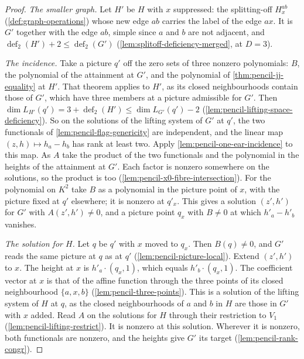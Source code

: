 \begin{proof}
  \leanok
  \emph{The smaller graph.} Let $H'$ be $H$ with $x$ suppressed: the
  splitting-off $H_x^{ab}$ (\cref{def:graph-operations}) whose new edge
  $ab$ carries the label of the edge $ax$. It is $G'$ together with the
  edge $ab$, simple since $a$ and $b$ are not adjacent, and
  $\operatorname{def}_2(H') + 2 \le \operatorname{def}_2(G')$
  (\cref{lem:splitoff-deficiency-merged}, at $D = 3$).

  \emph{The incidence.} Take a picture $q'$ off the zero sets of three
  nonzero polynomials: $B$, the polynomial of the attainment at $G'$, and
  the polynomial of \cref{thm:pencil-jj-equality} at $H'$. That theorem
  applies to $H'$, as its
  closed neighbourhoods contain those of $G'$, which have three members at
  a picture admissible for $G'$. Then
  $\dim L_{H'}(q') = 3 + \operatorname{def}_2(H') \le \dim L_{G'}(q') - 2$
  (\cref{lem:pencil-lifting-space-deficiency}). So on the solutions of the
  lifting system of $G'$ at $q'$, the two functionals of
  \cref{lem:pencil-flag-genericity} are independent, and the linear map
  $(z, h) \mapsto h_a - h_b$ has rank at least two. Apply
  \cref{lem:pencil-one-ear-incidence} to this map. As $A$ take the product
  of the two functionals and the polynomial in the heights of the
  attainment at $G'$. Each factor is nonzero somewhere on the solutions,
  so the product is too (\cref{lem:pencil-x0-fibre-intersection}). For the
  polynomial on $K^2$ take $B$ as a polynomial in the picture point of $x$,
  with the picture fixed at $q'$ elsewhere; it is nonzero at $q'_x$. This
  gives a solution $(z', h')$ for $G'$ with $A(z', h') \neq 0$, and a
  picture point $q_x$ with $B \neq 0$ at which $h'_a - h'_b$ vanishes.

  \emph{The solution for $H$.} Let $q$ be $q'$ with $x$ moved to $q_x$.
  Then $B(q) \neq 0$, and $G'$ reads the same picture at $q$ as at $q'$
  (\cref{lem:pencil-picture-local}). Extend $(z', h')$ to $x$. The height
  at $x$ is $h'_a \cdot (q_x, 1)$, which equals $h'_b \cdot (q_x, 1)$. The
  coefficient vector at $x$ is that of the affine function through the
  three points of its closed neighbourhood $\{a, x, b\}$
  (\cref{lem:pencil-three-points}). This is a solution of the lifting
  system of $H$ at $q$, as the closed neighbourhoods of $a$ and $b$ in $H$
  are those in $G'$ with $x$ added. Read $A$ on the solutions for $H$
  through their restriction to $V_1$ (\cref{lem:pencil-lifting-restrict}).
  It is nonzero at this solution. Wherever it is nonzero, both functionals
  are nonzero, and the heights give $G'$ its target
  (\cref{lem:pencil-rank-congr}).
\end{proof}

